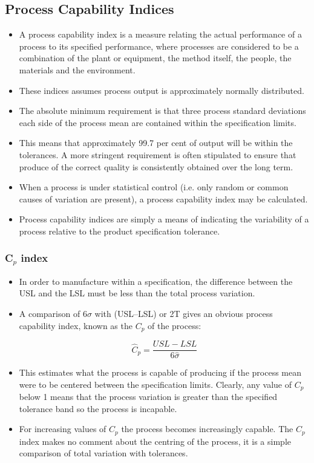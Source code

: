 \documentclass[MASTER-SPC.tex]{subfiles}
\begin{document}
	\subsection{Process Capability Indices}
\begin{itemize}
\item A process capability index is a measure relating the actual performance of a process to its specified performance, where processes are considered to be a combination of the plant or equipment, the method itself, the people, the materials and the environment. 
\item 	These indices assumes process output is approximately normally distributed.
\item 	
	The absolute minimum requirement is that three process standard deviations each side of the process mean are contained within the specification limits. 
	\item This means that approximately 99.7 per cent of output will be within the tolerances. A more stringent requirement is often stipulated to ensure that produce of the correct quality is consistently obtained over the long term.
	
\item 	When a process is under statistical control (i.e. only random or common
	causes of variation are present), a process capability index may be calculated. 
\item Process capability indices are simply a means of indicating the variability of a process relative to the product specification tolerance.
\end{itemize}	
\newpage


	
	\subsubsection*{C$_p$ index}
\begin{itemize}
\item	In order to manufacture within a specification, the difference between the
	USL and the LSL must be less than the total process variation.
	
\item A comparison of $6\sigma$ with (USL–LSL) or 2T gives an obvious process capability index, known as the $C_p$ of the process:
	
	
	\[\hat{C}_p = \frac{USL - LSL} {6 \hat{\sigma}}\]	
\item This estimates what the process is capable of producing if the process mean were to be centered between the specification limits. 
	Clearly, any value of $C_p$ below 1 means that the process variation is greater than the specified tolerance band so the process is incapable. 
	
\item For increasing values of $C_p$ the process becomes increasingly capable. The $C_p$ index makes no comment about the centring of the process, it is a simple comparison of total variation with tolerances.
\end{itemize}	
\end{document}
